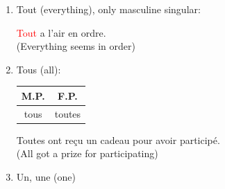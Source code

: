 \documentclass{book}
\begin{document}
\begin{enumerate}
\begin{center}
                \end{center}
            \item Tout (everything), only masculine singular:
                \begin{center}
                    \textcolor{red}{Tout} a l'air en ordre. \\
                    (Everything seems in order)
                \end{center}
            \item Tous (all):
                \begin{center}
                    \begin{tabular}{|c|c|}
                        \hline
                        \textbf{M.P.} & \textbf{F.P.} \\
                        \hline
                        tous & toutes \\
                        \hline
                    \end{tabular}
                \end{center}
                \begin{center}
                    Toutes ont reçu un cadeau pour avoir participé. \\
                    (All got a prize for participating)
                \end{center}
            \item Un, une (one)
        \end{enumerate}
\end{document}
